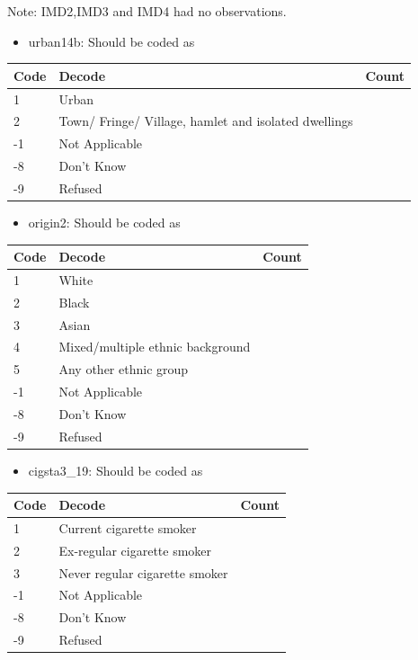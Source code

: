 \documentclass[
  11pt,
]{article}
\providecommand{\tightlist}{%
  \setlength{\itemsep}{0pt}\setlength{\parskip}{0pt}}
\begin{document}
Note: IMD2,IMD3 and IMD4 had no observations.

\begin{itemize}
\tightlist
\item
  urban14b: Should be coded as
\end{itemize}

\begin{longtable}[]{@{}lll@{}}
\toprule()
Code & Decode & Count \\
\midrule()
\endhead
1 & Urban & \\
2 & Town/ Fringe/ Village, hamlet and isolated dwellings & \\
-1 & Not Applicable & \\
-8 & Don't Know & \\
-9 & Refused & \\
\bottomrule()
\end{longtable}

\begin{itemize}
\tightlist
\item
  origin2: Should be coded as
\end{itemize}

\begin{longtable}[]{@{}lll@{}}
\toprule()
Code & Decode & Count \\
\midrule()
\endhead
1 & White & \\
2 & Black & \\
3 & Asian & \\
4 & Mixed/multiple ethnic background & \\
5 & Any other ethnic group & \\
-1 & Not Applicable & \\
-8 & Don't Know & \\
-9 & Refused & \\
\bottomrule()
\end{longtable}

\begin{itemize}
\tightlist
\item
  cigsta3\_19: Should be coded as
\end{itemize}

\begin{longtable}[]{@{}lll@{}}
\toprule()
Code & Decode & Count \\
\midrule()
\endhead
1 & Current cigarette smoker & \\
2 & Ex-regular cigarette smoker & \\
3 & Never regular cigarette smoker & \\
-1 & Not Applicable & \\
-8 & Don't Know & \\
-9 & Refused & \\
\bottomrule()
\end{longtable}
\end{document}
